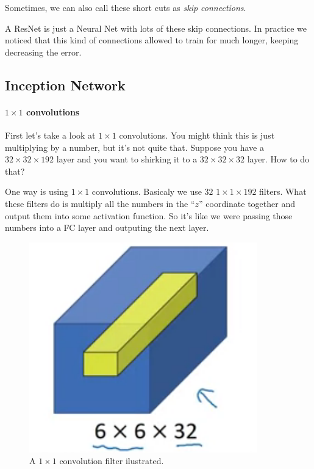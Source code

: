 \documentclass[12pt, a4paper, oneside]{book}
\begin{document}
Sometimes, we can also call these short cuts as \textit{skip connections}.

A ResNet is just a Neural Net with lots of these skip connections. In practice
we noticed that this kind of connections allowed to train for much longer,
keeping decreasing the error.

\subsection{Inception Network}%
\label{sub:inception_network}

\paragraph{$1\times 1$ convolutions}%
\label{par:_1times_1_convolutions}

First let's take a look at $1\times 1$ convolutions. You might think this is
just multiplying by a number, but it's not quite that. Suppose you have a
$32\times 32\times 192$ layer and you want to shirking it to a $32\times
32\times 32$ layer. How to do that?

One way is using $1\times 1$ convolutions. Basicaly we use $32$ $1\times
1\times 192$ filters. What these filters do is multiply all the numbers in the
``$z$'' coordinate together and output them into some activation function. So
it's like we were passing those numbers into a FC layer and outputing the next
layer.

\begin{figure}[h]
\centering
\includegraphics[scale=0.3]{Res/1x1-conv.png}
\caption{A $1\times 1$ convolution filter ilustrated.}
\label{1x1-conv.png}
\end{figure}
\end{document}
